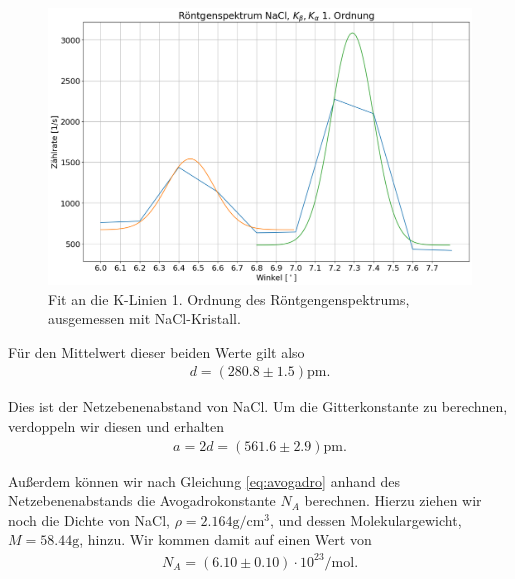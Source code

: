 \begin{figure}[H]
  \centering
  \includegraphics[width=.9\textwidth]{files/plots/nacl_k_1ord_fit.png}
  \caption{Fit an die K-Linien 1. Ordnung des Röntgengenspektrums, ausgemessen mit NaCl-Kristall.}
  \label{fig:nacl_k_1ord_fit}
\end{figure}


Für den Mittelwert dieser beiden Werte gilt also
\begin{align}
  d = (280.8 \pm 1.5)\si{\pico\meter}.
\end{align}

Dies ist der Netzebenenabstand von NaCl. Um die Gitterkonstante zu berechnen, verdoppeln wir diesen und erhalten
\begin{align}
  a = 2d = (561.6 \pm 2.9)\si{\pico\meter}.
\end{align}

Außerdem können wir nach Gleichung \eqref{eq:avogadro} anhand des Netzebenenabstands die Avogadrokonstante $N_A$ berechnen. Hierzu ziehen wir noch die Dichte von NaCl, $\rho = 2.164\si{\gram\per\centi\meter\cubed}$, und dessen Molekulargewicht, $M = 58.44\si{\gram}$, hinzu. Wir kommen damit auf einen Wert von
\begin{align}
  N_A = (6.10 \pm 0.10) \cdot 10^{23} \si{\per\mol}.
\end{align}
